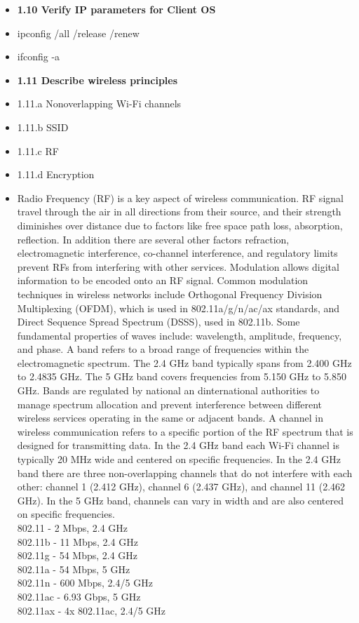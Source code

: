 \documentclass{article}
\begin{document}
\begin{itemize}
  \item \textbf{1.10 Verify IP parameters for Client OS}
  	\item[] ipconfig /all /release /renew
  	\item[] ifconfig -a
  
  \item \textbf{1.11 Describe wireless principles}
  	\item 1.11.a Nonoverlapping Wi-Fi channels
  	\item 1.11.b SSID
  	\item 1.11.c RF
  	\item 1.11.d Encryption
  	\item[] Radio Frequency (RF) is a key aspect of wireless communication. RF signal travel through the air in all directions from their source, and their strength diminishes over distance due to factors like free space path loss, absorption, reflection. In addition there are several other factors refraction, electromagnetic interference, co-channel interference, and regulatory limits prevent RFs from interfering with other services. Modulation allows digital information to be encoded onto an RF signal. Common modulation techniques in wireless networks include Orthogonal Frequency Division Multiplexing (OFDM), which is used in 802.11a/g/n/ac/ax standards, and Direct Sequence Spread Spectrum (DSSS), used in 802.11b. Some fundamental properties of waves include: wavelength, amplitude, frequency, and phase. A band refers to a broad range of frequencies within the electromagnetic spectrum. The 2.4 GHz band typically spans from 2.400 GHz to 2.4835 GHz. The 5 GHz band covers frequencies from 5.150 GHz to 5.850 GHz. Bands are regulated by national an dinternational authorities to manage spectrum allocation and prevent interference between different wireless services operating in the same or adjacent bands. A channel in wireless communication refers to a specific portion of the RF spectrum that is designed for transmitting data. In the 2.4 GHz band each Wi-Fi channel is typically 20 MHz wide and centered on specific frequencies. In the 2.4 GHz band there are three non-overlapping channels that do not interfere with each other: channel 1 (2.412 GHz), channel 6 (2.437 GHz), and channel 11 (2.462 GHz). In the 5 GHz band, channels can vary in width and are also centered on specific frequencies.\\
		802.11 - 2 Mbps, 2.4 GHz\\
		802.11b - 11 Mbps, 2.4 GHz\\
		802.11g - 54 Mbps, 2.4 GHz\\
		802.11a - 54 Mbps, 5 GHz\\
		802.11n - 600 Mbps, 2.4/5 GHz\\
		802.11ac - 6.93 Gbps, 5 GHz\\
		802.11ax - 4x 802.11ac, 2.4/5 GHz


\end{itemize}
\end{document}
